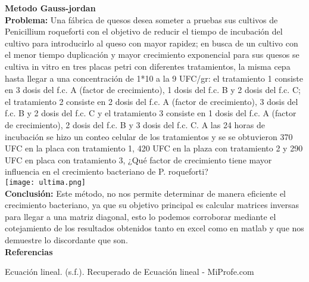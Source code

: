 \documentclass[12pt,a4paper]{article}
\begin{document}
\textbf{Metodo Gauss-jordan}\\
\textbf{Problema:} Una fábrica de quesos desea someter a pruebas sus cultivos de Penicillium roqueforti con el objetivo de reducir el tiempo de incubación del cultivo para introducirlo al queso con mayor rapidez; en busca de un cultivo con el menor tiempo duplicación y mayor crecimiento exponencial para sus quesos se cultiva in vitro  en tres placas petri con diferentes tratamientos, la misma cepa hasta llegar a una concentración de 1*10 a la 9 UFC/gr: el tratamiento 1 consiste en 3 dosis del f.c. A (factor de crecimiento), 1 dosis del f.c. B y 2 dosis del f.c. C; el tratamiento 2 consiste en 2 dosis del f.c. A (factor de crecimiento), 3 dosis del f.c. B y 2 dosis del f.c. C y el tratamiento 3 consiste en 1 dosis del f.c. A (factor de crecimiento), 2 dosis del f.c. B y 3 dosis del f.c. C. A las 24 horas de incubación se hizo un conteo celular de los tratamientos y se se obtuvieron  370 UFC en la placa con tratamiento 1, 420 UFC en la plaza con tratamiento 2 y 290 UFC en placa con tratamiento 3, ¿Qué factor de crecimiento tiene mayor influencia en el crecimiento bacteriano de P. roqueforti?\\
\texttt{[image: ultima.png]}\\
\textbf{Conclusión: }
Este método, no nos permite  determinar de manera eficiente el crecimiento bacteriano, ya que su objetivo principal es calcular matrices inversas para llegar a una matriz diagonal, esto lo podemos corroborar mediante el cotejamiento de los resultados obtenidos tanto en excel como en matlab y que nos demuestre lo discordante que son.\\



\textbf{Referencias}

Ecuación lineal. (s.f.). Recuperado de Ecuación lineal - MiProfe.com
\end{document}
